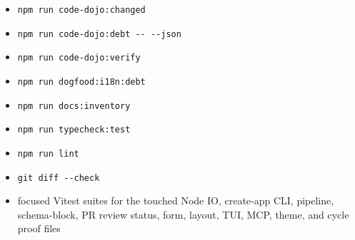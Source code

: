 \begin{itemize}
\tightlist
\item
  \texttt{n\allowbreak{}p\allowbreak{}m\allowbreak{} \allowbreak{}r\allowbreak{}u\allowbreak{}n\allowbreak{} \allowbreak{}c\allowbreak{}o\allowbreak{}d\allowbreak{}e\allowbreak{}-\allowbreak{}d\allowbreak{}o\allowbreak{}j\allowbreak{}o\allowbreak{}:\allowbreak{}c\allowbreak{}h\allowbreak{}a\allowbreak{}n\allowbreak{}g\allowbreak{}e\allowbreak{}d}
\item
  \texttt{n\allowbreak{}p\allowbreak{}m\allowbreak{} \allowbreak{}r\allowbreak{}u\allowbreak{}n\allowbreak{} \allowbreak{}c\allowbreak{}o\allowbreak{}d\allowbreak{}e\allowbreak{}-\allowbreak{}d\allowbreak{}o\allowbreak{}j\allowbreak{}o\allowbreak{}:\allowbreak{}d\allowbreak{}e\allowbreak{}b\allowbreak{}t\allowbreak{} \allowbreak{}-\allowbreak{}-\allowbreak{} \allowbreak{}-\allowbreak{}-\allowbreak{}j\allowbreak{}s\allowbreak{}o\allowbreak{}n}
\item
  \texttt{n\allowbreak{}p\allowbreak{}m\allowbreak{} \allowbreak{}r\allowbreak{}u\allowbreak{}n\allowbreak{} \allowbreak{}c\allowbreak{}o\allowbreak{}d\allowbreak{}e\allowbreak{}-\allowbreak{}d\allowbreak{}o\allowbreak{}j\allowbreak{}o\allowbreak{}:\allowbreak{}v\allowbreak{}e\allowbreak{}r\allowbreak{}i\allowbreak{}f\allowbreak{}y}
\item
  \texttt{n\allowbreak{}p\allowbreak{}m\allowbreak{} \allowbreak{}r\allowbreak{}u\allowbreak{}n\allowbreak{} \allowbreak{}d\allowbreak{}o\allowbreak{}g\allowbreak{}f\allowbreak{}o\allowbreak{}o\allowbreak{}d\allowbreak{}:\allowbreak{}i\allowbreak{}1\allowbreak{}8\allowbreak{}n\allowbreak{}:\allowbreak{}d\allowbreak{}e\allowbreak{}b\allowbreak{}t}
\item
  \texttt{n\allowbreak{}p\allowbreak{}m\allowbreak{} \allowbreak{}r\allowbreak{}u\allowbreak{}n\allowbreak{} \allowbreak{}d\allowbreak{}o\allowbreak{}c\allowbreak{}s\allowbreak{}:\allowbreak{}i\allowbreak{}n\allowbreak{}v\allowbreak{}e\allowbreak{}n\allowbreak{}t\allowbreak{}o\allowbreak{}r\allowbreak{}y}
\item
  \texttt{n\allowbreak{}p\allowbreak{}m\allowbreak{} \allowbreak{}r\allowbreak{}u\allowbreak{}n\allowbreak{} \allowbreak{}t\allowbreak{}y\allowbreak{}p\allowbreak{}e\allowbreak{}c\allowbreak{}h\allowbreak{}e\allowbreak{}c\allowbreak{}k\allowbreak{}:\allowbreak{}t\allowbreak{}e\allowbreak{}s\allowbreak{}t}
\item
  \texttt{n\allowbreak{}p\allowbreak{}m\allowbreak{} \allowbreak{}r\allowbreak{}u\allowbreak{}n\allowbreak{} \allowbreak{}l\allowbreak{}i\allowbreak{}n\allowbreak{}t}
\item
  \texttt{g\allowbreak{}i\allowbreak{}t\allowbreak{} \allowbreak{}d\allowbreak{}i\allowbreak{}f\allowbreak{}f\allowbreak{} \allowbreak{}-\allowbreak{}-\allowbreak{}c\allowbreak{}h\allowbreak{}e\allowbreak{}c\allowbreak{}k}
\item
  focused Vitest suites for the touched Node IO, create-app CLI, pipeline, schema-block, PR review status, form, layout, TUI, MCP, theme, and cycle proof files
\end{itemize}

